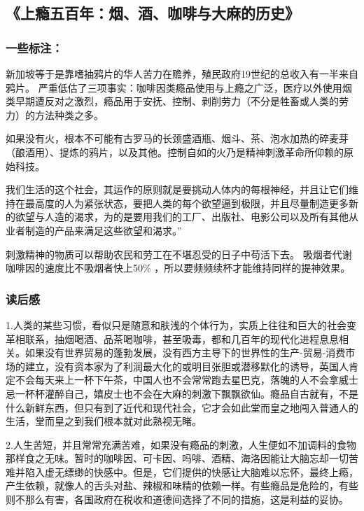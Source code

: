 \subsection{《上瘾五百年：烟、酒、咖啡与大麻的历史》}

\subsubsection{一些标注：}
新加坡等于是靠嗜抽鸦片的华人苦力在赡养，殖民政府19世纪的总收入有一半来自鸦片。
严重低估了三项事实：咖啡因类瘾品使用与上瘾之广泛，医疗以外使用烟类早期遭反对之激烈，瘾品用于安抚、控制、剥削劳力（不分是牲畜或人类的劳力）的方法种类之多。

如果没有火，根本不可能有古罗马的长颈盛酒瓶、烟斗、茶、泡水加热的碎麦芽（酿酒用）、提炼的鸦片，以及其他。控制自如的火乃是精神刺激革命所仰赖的原始科技。

我们生活的这个社会，其运作的原则就是要挑动人体内的每根神经，并且让它们维持在最高度的人为紧张状态，要把人类的每个欲望逼到极限，并且尽量制造更多新的欲望与人造的渴求，为的是要用我们的工厂、出版社、电影公司以及所有其他从业者制造的产品来满足这些欲望和渴求。”

刺激精神的物质可以帮助农民和劳工在不堪忍受的日子中苟活下去。
吸烟者代谢咖啡因的速度比不吸烟者快上50\% ，所以要频频续杯才能维持同样的提神效果。

\subsubsection{读后感}
1.人类的某些习惯，看似只是随意和肤浅的个体行为，实质上往往和巨大的社会变革相联系，抽烟喝酒、品茶喝咖啡，甚至吸毒，都和几百年的现代化进程息息相关。如果没有世界贸易的蓬勃发展，没有西方主导下的世界性的生产-贸易-消费市场的建立，没有资本家为了利润最大化的或明目张胆或潜移默化的诱导，英国人肯定不会每天来上一杯下午茶，中国人也不会常常跑去星巴克，落魄的人不会拿威士忌一杯杯灌醉自己，嬉皮士也不会在大麻的刺激下飘飘欲仙。瘾品自古就有，不是什么新鲜东西，但只有到了近代和现代社会，它才会如此堂而皇之地闯入普通人的生活，堂而皇之到我们根本就对此熟视无睹。

2.人生苦短，并且常常充满苦难，如果没有瘾品的刺激，人生便如不加调料的食物那样食之无味。暂时的咖啡因、可卡因、吗啡、酒精、海洛因能让大脑忘却一切苦难并陷入虚无缥缈的快感中。但是，它们提供的快感让大脑难以忘怀，最终上瘾，产生依赖，就像人的舌头对盐、辣椒和味精的依赖一样。有些瘾品是危险的，有些则不那么有害，各国政府在税收和道德间选择了不同的措施，这是利益的妥协。